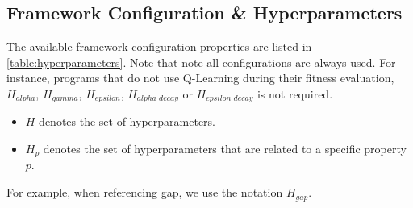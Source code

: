\documentclass[12pt, final]{dalcsthesis}
\begin{document}
\subsection{Framework Configuration \& Hyperparameters}

The available framework configuration properties are listed in \ref{table:hyperparameters}. Note that note all configurations are always used.
For instance, programs that do not use Q-Learning during their fitness evaluation, $H_{alpha}$, $H_{gamma}$, $H_{epsilon}$, $H_{alpha\_decay}$ or $H_{epsilon\_decay}$ is not required.
\begin{itemize}
	\item $H$ denotes the set of hyperparameters.
	\item $H_{p}$ denotes the set of hyperparameters that are related to a specific property $p$.
\end{itemize}
For example, when referencing gap, we use the notation $H_{gap}$.
\end{document}
